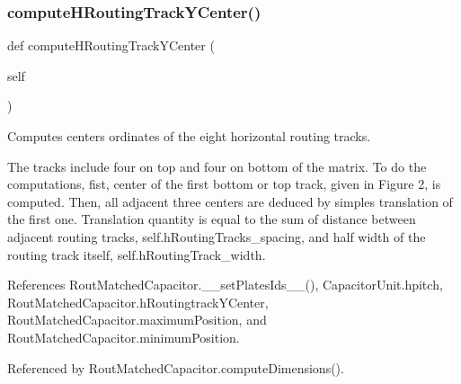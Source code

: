 \mbox{\label{classpython_1_1capacitorrouted_1_1RoutMatchedCapacitor_ab5ada06fee186d6a8666421263c0baa6}} 
\subsubsection{\texorpdfstring{compute\+H\+Routing\+Track\+Y\+Center()}{computeHRoutingTrackYCenter()}}
{\footnotesize\ttfamily def compute\+H\+Routing\+Track\+Y\+Center (\begin{DoxyParamCaption}\item[{}]{self }\end{DoxyParamCaption})}



Computes centers\textquotesingle{} ordinates of the eight horizontal routing tracks. 

The tracks include four on top and four on bottom of the matrix. To do the computations, fist, center of the first bottom or top track, given in Figure 2, is computed. Then, all adjacent three centers are deduced by simples translation of the first one. Translation quantity is equal to the sum of distance between adjacent routing tracks, self.\+h\+Routing\+Tracks\+\_\+spacing, and half width of the routing track itself, {\ttfamily self.\+h\+Routing\+Track\+\_\+width}. 

References Rout\+Matched\+Capacitor.\+\_\+\+\_\+set\+Plates\+Ids\+\_\+\+\_\+(), Capacitor\+Unit.\+hpitch, Rout\+Matched\+Capacitor.\+h\+Routingtrack\+Y\+Center, Rout\+Matched\+Capacitor.\+maximum\+Position, and Rout\+Matched\+Capacitor.\+minimum\+Position.



Referenced by Rout\+Matched\+Capacitor.\+compute\+Dimensions().

\mbox{\label{classpython_1_1capacitorrouted_1_1RoutMatchedCapacitor_a71bee512b44ecf046fc420bf5040fb89}} 
